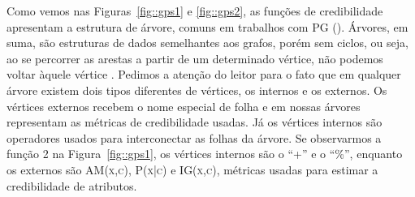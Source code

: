 Como vemos nas Figuras~\ref{fig::gps1} e \ref{fig::gps2}, as funções de credibilidade apresentam a estrutura de árvore, comuns em trabalhos com \textsc{PG} (\cite{Koza92}). 
Árvores, em suma, são estruturas de dados semelhantes aos grafos, porém sem ciclos, ou seja, ao se percorrer as arestas a partir de um determinado vértice, não podemos voltar àquele vértice
.
Pedimos a atenção do leitor para o fato que em qualquer árvore existem dois tipos diferentes de vértices, os internos e os externos.
Os vértices externos recebem o nome especial de folha e em nossas árvores representam as métricas de credibilidade usadas.
Já os vértices internos são operadores usados para interconectar as folhas da árvore. Se observarmos a função 2 na Figura~\ref{fig::gps1}, os vértices internos são o ``+'' e o ``\%'', enquanto os externos são \textsc{AM(x,c)}, \textsc{P(x|c)} e \textsc{IG(x,c)}, métricas usadas para estimar a credibilidade de atributos.

